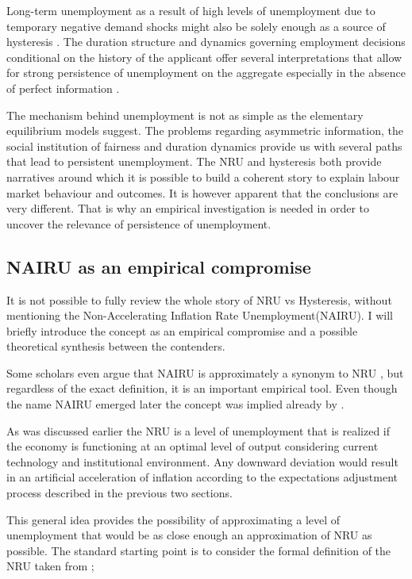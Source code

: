 \documentclass[12pt,a4paper,english]{article}
\begin{document}
Long-term unemployment as a result of high levels of unemployment due to temporary negative demand shocks might also be solely enough as a source of hysteresis \cite{verho2014}. The duration structure and dynamics governing employment decisions conditional on the history of the applicant offer several interpretations that allow for strong persistence of unemployment on the aggregate especially in the absence of perfect information \citep{baker1992,krueger2014,eriksson2014}.

The mechanism behind unemployment is not as simple as the elementary equilibrium models suggest. The problems regarding asymmetric information, the social institution of fairness and duration dynamics provide us with several paths that lead to persistent unemployment. The NRU and hysteresis both provide narratives around which it is possible to build a coherent story to explain labour market behaviour and outcomes. It is however apparent that the conclusions are very different. That is why an empirical investigation is needed in order to uncover the relevance of persistence of unemployment.

\vspace{2cm}

\subsection{NAIRU as an empirical compromise}


It is not possible to fully review the whole story of NRU vs Hysteresis, without mentioning the Non-Accelerating Inflation Rate Unemployment(NAIRU). I will briefly introduce the concept as an empirical compromise and a possible theoretical synthesis between the contenders. 

Some scholars even argue that NAIRU is approximately a synonym to NRU \citep{ballmankiw2002}, but regardless of the exact definition, it is an important empirical tool. Even though the name NAIRU emerged later the concept was implied already by \cite{friedman1968}. 

As was discussed earlier the NRU is a level of unemployment that is realized if the economy is functioning at an optimal level of output considering current technology and institutional environment. Any downward deviation would result in an artificial acceleration of inflation according to the expectations adjustment process described in the previous two sections.

This general idea provides the possibility of approximating a level of unemployment that would be as close enough an approximation of NRU as possible. The standard starting point is to consider the formal definition of the NRU taken from \cite{friedman1968};
\end{document}
